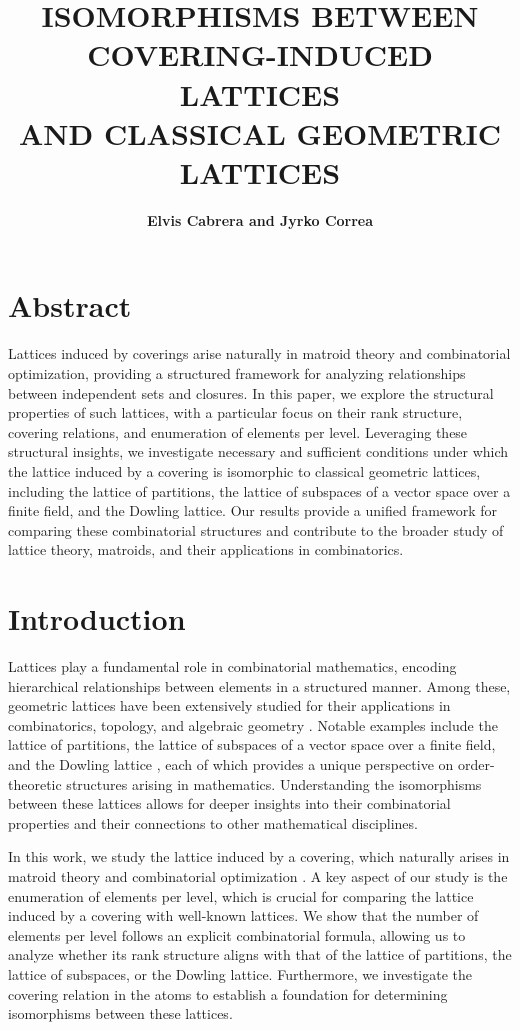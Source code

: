 \documentclass{article}
\title{\textbf{ISOMORPHISMS BETWEEN COVERING-INDUCED LATTICES \\ AND CLASSICAL GEOMETRIC LATTICES}}
\author{\textbf{Elvis Cabrera and Jyrko Correa}}
\date{} %
\begin{document}
\maketitle

\section{Abstract}

Lattices induced by coverings arise naturally in matroid theory and combinatorial optimization, providing a structured framework for analyzing relationships between independent sets and closures. In this paper, we explore the structural properties of such lattices, with a particular focus on their rank structure, covering relations, and enumeration of elements per level. Leveraging these structural insights, we investigate necessary and sufficient conditions under which the lattice induced by a covering is isomorphic to classical geometric lattices, including the lattice of partitions, the lattice of subspaces of a vector space over a finite field, and the Dowling lattice. Our results provide a unified framework for comparing these combinatorial structures and contribute to the broader study of lattice theory, matroids, and their applications in combinatorics.

\section{Introduction}

   Lattices play a fundamental role in combinatorial mathematics, encoding hierarchical relationships between elements in a structured manner. Among these, geometric lattices have been extensively studied for their applications in combinatorics, topology, and algebraic geometry \citep{Bjorner1992, Oxley2006}. Notable examples include the lattice of partitions, the lattice of subspaces of a vector space over a finite field, and the Dowling lattice \citep{Dowling1973}, each of which provides a unique perspective on order-theoretic structures arising in mathematics. Understanding the isomorphisms between these lattices allows for deeper insights into their combinatorial properties and their connections to other mathematical disciplines.

In this work, we study the lattice induced by a covering, which naturally arises in matroid theory and combinatorial optimization \citep{Welsh1976, Oxley2006}. A key aspect of our study is the enumeration of elements per level, which is crucial for comparing the lattice induced by a covering with well-known lattices. We show that the number of elements per level follows an explicit combinatorial formula, allowing us to analyze whether its rank structure aligns with that of the lattice of partitions, the lattice of subspaces, or the Dowling lattice. Furthermore, we investigate the covering relation in the atoms to establish a foundation for determining isomorphisms between these lattices.
\end{document}
